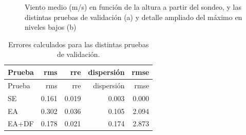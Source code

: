 \documentclass[12pt,spanish,oneside, a4paper]{book}
\begin{document}
\begin{figure}

{\centering {}

}

\caption{Viento medio (m/s) en función de la altura a partir del sondeo, y las distintas pruebas de validación (a) y detalle ampliado del máximo en niveles bajos (b) \label{validacion-perfiles}}\label{fig:validacion-perfiles}
\end{figure}

\begin{longtable}[]{@{}lrrrr@{}}
\caption{Errores calculados para las distintas pruebas de validación.
\label{validacion-errores}}\tabularnewline
\toprule
Prueba & rms & rre & dispersión & rmse\tabularnewline
\midrule
\endfirsthead
\toprule
Prueba & rms & rre & dispersión & rmse\tabularnewline
\midrule
\endhead
SE & 0.161 & 0.019 & 0.003 & 0.000\tabularnewline
EA & 0.302 & 0.036 & 0.105 & 2.094\tabularnewline
EA+DF & 0.178 & 0.021 & 0.174 & 2.873\tabularnewline
\bottomrule
\end{longtable}
\end{document}

